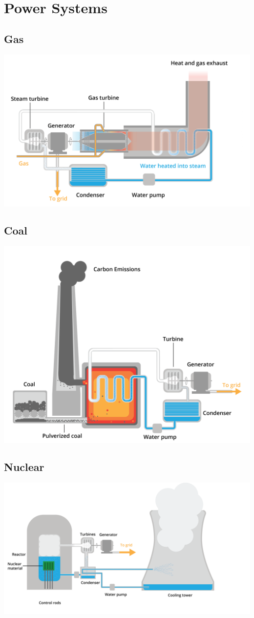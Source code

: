 \chapter{Power Systems}


\section{Gas}
\includegraphics[width=.75\textwidth]{gas.png}

\section{Coal}
\includegraphics[width=.75\textwidth]{coal.png}

\section{Nuclear}
\includegraphics[width=.75\textwidth]{nuclear.png}

